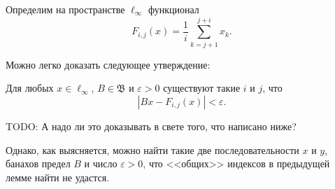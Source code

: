 Определим на пространстве $\ell_\infty$ функционал
\begin{equation}
	F_{i,j} (x) =\frac{1}{i} \sum_{k=j+1}^{j+i} x_k
	.
\end{equation}

Можно легко доказать следующее утверждение:

\begin{lemma}
	Для любых $x\in\ell_\infty$, $B\in\mathfrak{B}$ и $\varepsilon>0$ существуют такие $i$ и $j$,
	что
	\begin{equation}
		\label{eq:sucheston_approx_epsilon}
		|Bx - F_{i,j}(x)| < \varepsilon
		.
	\end{equation}
\end{lemma}

TODO: А надо ли это доказывать в свете того, что написано ниже?

Однако, как выясняется, можно найти такие две последовательности $x$ и $y$,
банахов предел $B$ и число $\varepsilon>0$, что <<общих>> индексов в предыдущей лемме найти не удастся.

